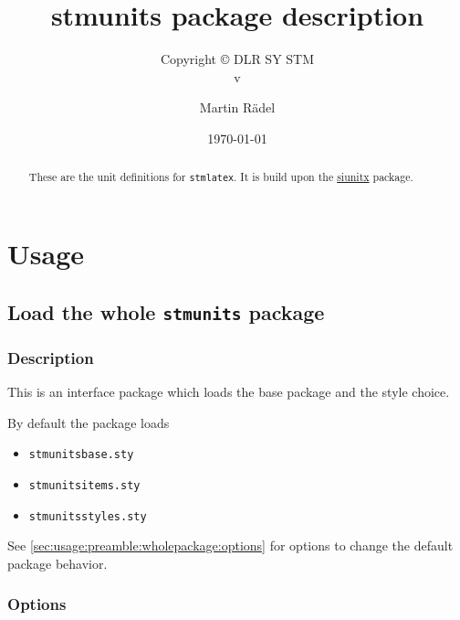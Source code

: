 \documentclass[%
  type=article,%
  layout=koma,%
  cleveref=true,%
  conditionallox=true,%
  conditionalloxnewpage=false,%
  date=true,%
  hyperref=true,%
  index=true,%
  listings=true,%
  math=true,%
]{stmtext}
\author{Martin R\"{a}del}
\title{stmunits package description}
\subtitle{Copyright \copyright{} \the\year{} DLR SY STM\\v\formatdate[versiondatestyle]{\DTMToday}}
\date{\today}
\begin{document}
\maketitle

\begin{abstract}
These are the unit definitions for \texttt{stmlatex}. It is build upon the \href{https://ctan.org/pkg/siunitx}{siunitx} package.
\end{abstract}

\tableofcontents

\conditionallistoffigures  %
\conditionallistoftables   %
\conditionallistoflistings %

\section{Usage}%

\subsection{Load the whole \protect\texttt{stmunits} package}
\label{sec:usage:preamble:wholepackage}

\subsubsection{Description}
\label{sec:usage:preamble:wholepackage:description}

This is an interface package which loads the base package and the style choice.

By default the package loads

\begin{itemize}[noitemsep]
  \item \verb+stmunitsbase.sty+
  \item \verb+stmunitsitems.sty+
  \item \verb+stmunitsstyles.sty+
\end{itemize}

See \autoref{sec:usage:preamble:wholepackage:options} for options to change the default package behavior.

\subsubsection{Options}
\label{sec:usage:preamble:wholepackage:options}
\end{document}
